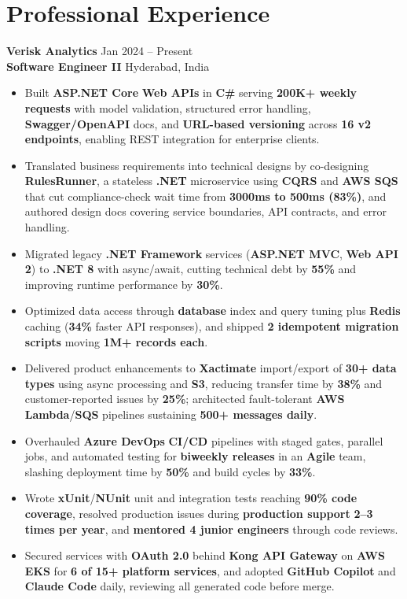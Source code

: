 \documentclass[a4paper,10pt]{article}
\begin{document}
\section*{Professional Experience}

\textbf{Verisk Analytics} \hfill Jan 2024 -- Present \\
\textbf{Software Engineer II} \hfill Hyderabad, India

\begin{itemize}[leftmargin=*]
    \item Built \textbf{ASP.NET Core} \textbf{Web APIs} in \textbf{C\#} serving \textbf{200K+ weekly requests} with model validation, structured error handling, \textbf{Swagger/OpenAPI} docs, and \textbf{URL-based versioning} across \textbf{16 v2 endpoints}, enabling REST integration for enterprise clients.
    \item Translated business requirements into technical designs by co-designing \textbf{RulesRunner}, a stateless \textbf{.NET} microservice using \textbf{CQRS} and \textbf{AWS SQS} that cut compliance-check wait time from \textbf{3000ms to 500ms (83\%)}, and authored design docs covering service boundaries, API contracts, and error handling.
    \item Migrated legacy \textbf{.NET Framework} services (\textbf{ASP.NET MVC}, \textbf{Web API 2}) to \textbf{.NET 8} with async/await, cutting technical debt by \textbf{55\%} and improving runtime performance by \textbf{30\%}.
    \item Optimized data access through \textbf{database} index and query tuning plus \textbf{Redis} caching (\textbf{34\%} faster API responses), and shipped \textbf{2 idempotent migration scripts} moving \textbf{1M+ records each}.
    \item Delivered product enhancements to \textbf{Xactimate} import/export of \textbf{30+ data types} using async processing and \textbf{S3}, reducing transfer time by \textbf{38\%} and customer-reported issues by \textbf{25\%}; architected fault-tolerant \textbf{AWS Lambda}/\textbf{SQS} pipelines sustaining \textbf{500+ messages daily}.
    \item Overhauled \textbf{Azure DevOps} \textbf{CI/CD} pipelines with staged gates, parallel jobs, and automated testing for \textbf{biweekly releases} in an \textbf{Agile} team, slashing deployment time by \textbf{50\%} and build cycles by \textbf{33\%}.
    \item Wrote \textbf{xUnit}/\textbf{NUnit} unit and integration tests reaching \textbf{90\% code coverage}, resolved production issues during \textbf{production support} \textbf{2--3 times per year}, and \textbf{mentored 4 junior engineers} through code reviews.
    \item Secured services with \textbf{OAuth 2.0} behind \textbf{Kong API Gateway} on \textbf{AWS EKS} for \textbf{6 of 15+ platform services}, and adopted \textbf{GitHub Copilot} and \textbf{Claude Code} daily, reviewing all generated code before merge.
\end{itemize}
\end{document}
